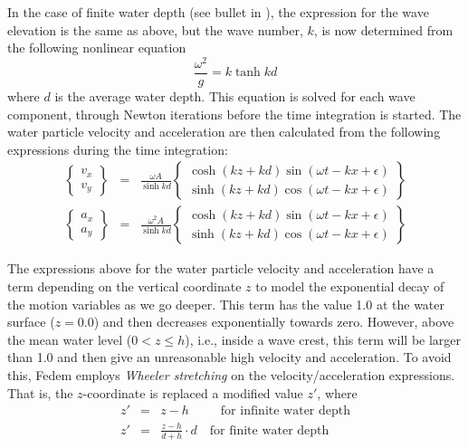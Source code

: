 In the case of finite water depth (see bullet  in
), the expression for
the wave elevation is the same as above, but the wave number, $k$,
is now determined from the following nonlinear equation
%
\begin{equation}
\frac{\omega^2}{g} = k\tanh kd
\end{equation}
%
where $d$ is the average water depth.
This equation is solved for each wave component,
through Newton iterations before the time integration is started.
The water particle velocity and acceleration
are then calculated from the following expressions during the time integration:
%
\begin{eqnarray}
 \left\{\!\!\begin{array}{c} v_x \\ v_y \end{array}\!\!\right\} &=&
 \frac{\omega A}{\sinh kd}\left\{\begin{array}{c}
  \cosh\left(kz+kd\right)\sin\left(\omega t - kx + \epsilon\right) \\
  \sinh\left(kz+kd\right)\cos\left(\omega t - kx + \epsilon\right)
 \end{array}\right\} \\[2mm]
 \left\{\!\!\begin{array}{c} a_x \\ a_y \end{array}\!\!\right\} &=&
 \frac{\omega^2A}{\sinh kd}\left\{\begin{array}{c}
  \cosh\left(kz+kd\right)\sin\left(\omega t - kx + \epsilon\right) \\
  \sinh\left(kz+kd\right)\cos\left(\omega t - kx + \epsilon\right)
 \end{array}\right\}
\end{eqnarray}


\noindent The expressions above for the water particle velocity and
acceleration have a term depending on the vertical coordinate $z$
to model the exponential decay of the motion variables as we go deeper.
This term has the value 1.0 at the water surface ($z=0.0$) and then decreases
exponentially towards zero. However, above the mean water level ($0 < z \le h$),
i.e., inside a wave crest, this term will be larger than 1.0 and then give
an unreasonable high velocity and acceleration.
To avoid this, Fedem employs {\sl Wheeler stretching}
on the velocity/acceleration expressions.
That is, the $z$-coordinate is replaced a modified value $z'$, where
%
\begin{eqnarray}
z' &=& z-h \quad\quad\;\:\mbox{for infinite water depth} \\
z' &=& \frac{z-h}{d+h}\cdot d \quad\mbox{for finite water depth}
\end{eqnarray}

